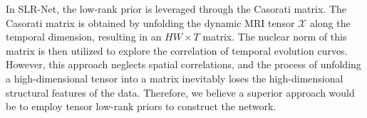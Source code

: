 In SLR-Net, the low-rank prior is leveraged through the Casorati matrix. The Casorati matrix is obtained by unfolding the dynamic MRI tensor $\mathcal{X}$ along the temporal dimension, resulting in an $HW \times T$ matrix. The nuclear norm of this matrix is then utilized to explore the correlation of temporal evolution curves. However, this approach neglects spatial correlations, and the process of unfolding a high-dimensional tensor into a matrix inevitably loses the high-dimensional structural features of the data. Therefore, we believe a superior approach would be to employ tensor low-rank priors to construct the network. 



